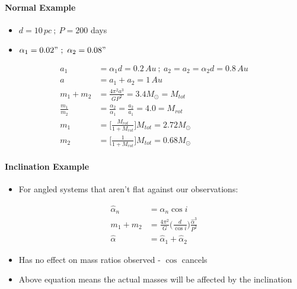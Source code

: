\documentclass[a4paper,11pt,normalem]{article}
\begin{document}
\paragraph{Normal Example}
\begin{itemize}
    \item \(d = 10\,pc ~;~ P = 200\) days
    \item \(\alpha_1 = 0.02" ~;~ \alpha_2 = 0.08"\)
\end{itemize}

\begin{align}
    a_1 &= \alpha_1 d = 0.2\,Au ~;~ a_2 = a_2 = \alpha_2 d = 0.8\,Au \\
    a &= a_1 + a_2 = 1\,Au \\
    m_1 + m_2 &= \frac{4\pi^2 a^3}{GP^2} = 3.4 M_\odot = M_{tot} \\
    \frac{m_1}{m_2} &= \frac{\alpha_2}{\alpha_1} = \frac{a_2}{a_1} = 4.0 = M_{rot}\\
    m_1 &= \Big[\frac{M_{rot}}{1 + M_{rot}}\Big]M_{tot} = 2.72 M_\odot\\
    m_2 &= \Big[\frac{1}{1 + M_{rot}}\Big]M_{tot} = 0.68 M_\odot
\end{align}

\paragraph{Inclination Example}
\begin{itemize}
    \item For angled systems that aren't flat against our observations:
\end{itemize}
\begin{align}
    \hat{\alpha}_n &= \alpha_n \cos i\\
    m_1 + m_2 &= \frac{4\pi^2}{G} \Big(\frac{d}{\cos i}\Big)\frac{\hat{\alpha}^3}{P^2}\\
    \hat{\alpha} &= \hat{\alpha}_1 + \hat{\alpha}_2
\end{align}
\begin{itemize}
    \item Has no effect on mass ratios observed - \(\cos\) cancels
    \item Above equation means the actual masses will be affected by the inclination
\end{itemize}
\end{document}
